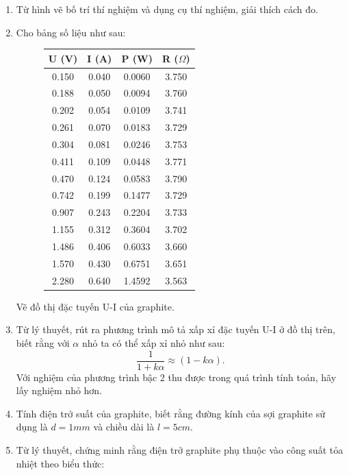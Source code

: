\begin{enumerate}[label=(\alph*)]
\item Từ hình vẽ bố trí thí nghiệm và dụng cụ thí nghiệm, giải thích cách đo.
\newpage 
\item Cho bảng số liệu như sau: 
\begin{figure}[H]
{\large
\begin{tabular}{|c|c|c|c|}
\hline
\textbf{U (V)} & \textbf{I (A)} & \textbf{P (W)} & \textbf{R ($\Omega$)} \\
\hline
0.150 & 0.040 & 0.0060 & 3.750 \\
0.188 & 0.050 & 0.0094 & 3.760 \\
0.202 & 0.054 & 0.0109 & 3.741 \\
0.261 & 0.070 & 0.0183 & 3.729 \\
0.304 & 0.081 & 0.0246 & 3.753 \\
0.411 & 0.109 & 0.0448 & 3.771 \\
0.470 & 0.124 & 0.0583 & 3.790 \\
0.742 & 0.199 & 0.1477 & 3.729 \\
0.907 & 0.243 & 0.2204 & 3.733 \\
1.155 & 0.312 & 0.3604 & 3.702 \\
1.486 & 0.406 & 0.6033 & 3.660 \\
1.570 & 0.430 & 0.6751 & 3.651 \\
2.280 & 0.640 & 1.4592 & 3.563 \\
\hline
\end{tabular}
}
    \centering
    \caption{}
\end{figure}
Vẽ đồ thị đặc tuyến U-I của graphite.
\item Từ lý thuyết, rút ra phương trình mô tả xấp xỉ đặc tuyến U-I ở đồ thị trên, biết rằng với $\alpha$ nhỏ ta có thể xấp xỉ nhỏ như sau: \begin{equation}
    \dfrac{1}{1+k\alpha} \approx (1-k\alpha).
\end{equation}
Với nghiệm của phương trình bậc 2 thu được trong quá trình tính toán, hãy lấy nghiệm nhỏ hơn.
\item Tính điện trở suất của graphite, biết rằng đường kính của sợi graphite sử dụng là $d=1 mm$ và chiều dài là $l= 5cm$.
\item Từ lý thuyết, chứng minh rằng điện trở graphite phụ thuộc vào công suất tỏa nhiệt theo biểu thức:


\end{enumerate}
